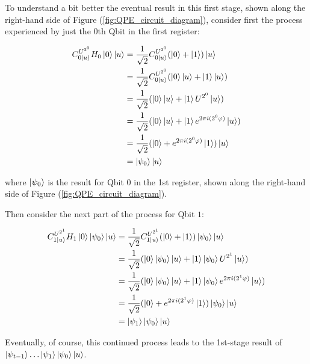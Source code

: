 \documentclass{article}
\begin{document}
\begin{enumerate}[label=\textbf{(\arabic*)}]
\begin{itemize}
  \vspace{0.05in}
  
  To understand a bit better the eventual result in this first stage, shown along the right-hand side of Figure (\ref{fig:QPE_circuit_diagram}), consider first the process experienced by just the $0$th Qbit in the first register:
  
  \begin{align}
      C_{0\ket{u}}^{U^{2^0}}H_{0}\ket{0}\ket{u}
      &=
      \frac{1}{\sqrt{2}}C_{0\ket{u}}^{U^{2^0}}(\ket{0} + \ket{1})\ket{u}\\
      &=
      \frac{1}{\sqrt{2}}C_{0\ket{u}}^{U^{2^0}}(\ket{0}\ket{u} + \ket{1}\ket{u})\\
      &=
      \frac{1}{\sqrt{2}}(\ket{0}\ket{u} + \ket{1}U^{2^0}\ket{u})\\
      &=
      \frac{1}{\sqrt{2}}(\ket{0}\ket{u} + \ket{1}e^{2\pi i (2^0 \varphi)}\ket{u})\\
      &=
      \frac{1}{\sqrt{2}}(\ket{0} + e^{2\pi i (2^0 \varphi)}\ket{1})\ket{u}\\
      &=
      \ket{\psi_0}\ket{u}
  \end{align}

where $\ket{\psi_0}$ is the result for Qbit $0$ in the 1st register, shown along the right-hand side of Figure (\ref{fig:QPE_circuit_diagram}).

Then consider the next part of the process for Qbit $1$:

\begin{align}
      C_{1\ket{u}}^{U^{2^1}}H_{1}\ket{0}\ket{\psi_0}\ket{u}
      &=
      \frac{1}{\sqrt{2}}
      C_{1\ket{u}}^{U^{2^1}}(\ket{0}+\ket{1})\ket{\psi_0}\ket{u}\\
      &=
      \frac{1}{\sqrt{2}}
      (\ket{0}\ket{\psi_0}\ket{u}+\ket{1}\ket{\psi_0}U^{2^1}\ket{u})\\
      &=
      \frac{1}{\sqrt{2}}
      (\ket{0}\ket{\psi_0}\ket{u}+\ket{1}\ket{\psi_0}e^{2\pi i (2^1 \varphi)}\ket{u})\\
      &=
      \frac{1}{\sqrt{2}}
      (\ket{0}+e^{2\pi i (2^1 \varphi)}\ket{1})\ket{\psi_0}\ket{u}\\
      &=
      \ket{\psi_1}\ket{\psi_0}\ket{u}
  \end{align}

\vspace{0.1in}

  Eventually, of course, this continued process leads to the 1st-stage result of $\ket{\psi_{t-1}}\ldots\ket{\psi_1}\ket{\psi_0}\ket{u}$.


\end{itemize}
\end{enumerate}
\end{document}
